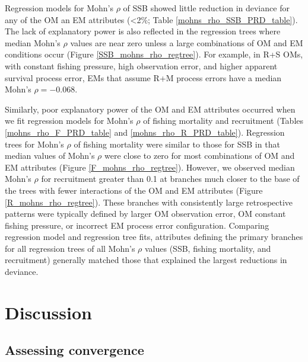\documentclass[
  12pt,
]{article}
\begin{document}
Regression models for Mohn's \(\rho\) of SSB showed little reduction in
deviance for any of the OM an EM attributes (\textless2\%; Table
\ref{mohns_rho_SSB_PRD_table}). The lack of explanatory power is also
reflected in the regression trees where median Mohn's \(\rho\) values
are near zero unless a large combinations of OM and EM conditions occur
(Figure \ref{SSB_mohns_rho_regtree}). For example, in R+S OMs, with
constant fishing pressure, high observation error, and higher apparent
survival process error, EMs that assume R+M process errors have a median
Mohn's \(\rho = -0.068\).

Similarly, poor explanatory power of the OM and EM attributes occurred
when we fit regression models for Mohn's \(\rho\) of fishing mortality
and recruitment (Tables \ref{mohns_rho_F_PRD_table} and
\ref{mohns_rho_R_PRD_table}). Regression trees for Mohn's \(\rho\) of
fishing mortality were similar to those for SSB in that median values of
Mohn's \(\rho\) were close to zero for most combinations of OM and EM
attributes (Figure \ref{F_mohns_rho_regtree}). However, we observed
median Mohn's \(\rho\) for recruitment greater than 0.1 at branches much
closer to the base of the trees with fewer interactions of the OM and EM
attributes (Figure \ref{R_mohns_rho_regtree}). These branches with
consistently large retrospective patterns were typically defined by
larger OM observation error, OM constant fishing pressure, or incorrect
EM process error configuration. Comparing regression model and
regression tree fits, attributes defining the primary branches for all
regression trees of all Mohn's \(\rho\) values (SSB, fishing mortality,
and recruitment) generally matched those that explained the largest
reductions in deviance.

\section*{Discussion}\label{discussion}

\subsection*{Assessing convergence}\label{assessing-convergence}
\end{document}
